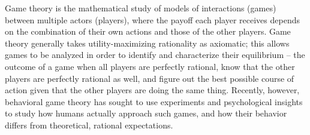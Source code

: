 Game theory is the mathematical study of models of interactions (games) between multiple actors (players), where the payoff each player receives depends on the combination of their own actions and those of the other players. Game theory generally takes utility-maximizing rationality as axiomatic; this allows games to be analyzed in order to identify and characterize their equilibrium -- the outcome of a game when all players are perfectly rational, know that the other players are perfectly rational as well, and figure out the best possible course of action given that the other players are doing the same thing. Recently, however, behavioral game theory \citep{camerer_2003} has sought to use experiments and psychological insights to study how humans actually approach such games, and how their behavior differs from theoretical, rational expectations.



